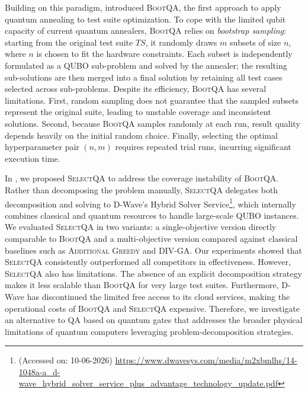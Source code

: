 Building on this paradigm, \citet{bootqa} introduced \textsc{BootQA}, the first approach to apply quantum annealing to test suite optimization. To cope with the limited qubit capacity of current quantum annealers, \textsc{BootQA} relies on \textit{bootstrap sampling}: starting from the original test suite
$TS$, it randomly draws $m$ subsets of size $n$, where $n$ is chosen to fit the hardware constraints. Each subset is independently formulated as a QUBO sub-problem and solved by the annealer; the resulting sub-solutions are then merged into a final solution by retaining all test cases selected across sub-problems.
Despite its efficiency, \textsc{BootQA} has several limitations. First, random sampling does not guarantee that the sampled subsets represent the original suite, leading to unstable coverage and inconsistent solutions. Second, because \textsc{BootQA} samples randomly at each run, result quality depends heavily on the initial random choice. Finally, selecting the optimal hyperparameter pair $(n,m)$ requires repeated trial runs, incurring significant execution time.

In \citet{selectqa}, we proposed \textsc{SelectQA} to address the coverage instability of \textsc{BootQA}. Rather than decomposing the problem manually, \textsc{SelectQA} delegates both decomposition and solving to D-Wave's Hybrid Solver Service\footnote{(Accessed on: 10-06-2026) \url{https://www.dwavesys.com/media/m2xbmlhs/14-1048a-a_d-wave_hybrid_solver_service_plus_advantage_technology_update.pdf}}, which internally combines classical and quantum resources to handle large-scale QUBO instances. We evaluated \textsc{SelectQA} in two variants: a single-objective version directly comparable to \textsc{BootQA} and a multi-objective version compared against classical baselines such as \textsc{Additional Greedy} and \textsc{DIV-GA}. Our experiments showed that \textsc{SelectQA} consistently outperformed all competitors in effectiveness.
However, \textsc{SelectQA} also has limitations. The absence of an explicit decomposition strategy makes it less scalable than \textsc{BootQA} for very large test suites. Furthermore, D-Wave has discontinued the limited free access to its cloud services, making the operational costs of \textsc{BootQA} and \textsc{SelectQA} expensive. Therefore, we investigate an alternative to QA based on quantum gates that addresses the broader physical limitations of quantum computers leveraging problem-decomposition strategies.

